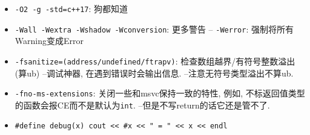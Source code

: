 \begin{itemize}
	\item \texttt{-O2 -g -std=c++17}: 狗都知道
	\item \texttt{-Wall -Wextra -Wshadow -Wconversion}: 更多警告
		\subitem --\; \texttt{-Werror}: 强制将所有Warning变成Error
	\item \texttt{-fsanitize=(address/undefined/ftrapv)}: 检查数组越界/有符号整数溢出(算ub)
		\subitem --\;调试神器, 在遇到错误时会输出信息.
		\subitem --\;注意无符号类型溢出不算ub.
	\item \texttt{-fno-ms-extensions}: 关闭一些和msvc保持一致的特性, 例如, 不标返回值类型的函数会报CE而不是默认为\texttt{int}.
		\subitem --\;但是不写return的话它还是管不了.
	\item \texttt{#define debug(x) cout << #x << " = " << x << endl}
\end{itemize}